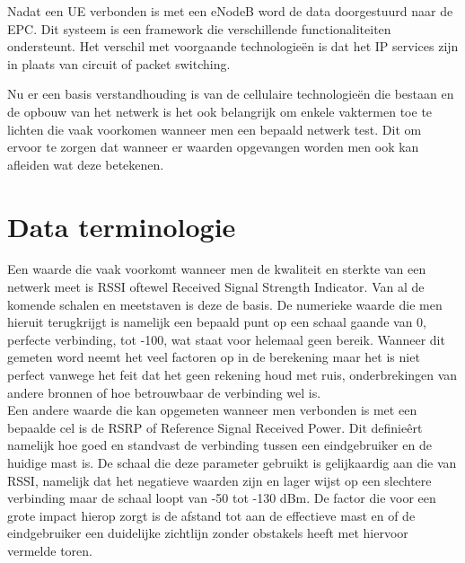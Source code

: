 Nadat een UE verbonden is met een eNodeB word de data doorgestuurd naar de EPC. Dit systeem is een framework die verschillende functionaliteiten ondersteunt. Het verschil met voorgaande technologieën is dat het IP services zijn in plaats van circuit of packet switching. \autocite{Awati2024}

\pagebreak

Nu er een basis verstandhouding is van de cellulaire technologieën die bestaan en de opbouw van het netwerk is het ook belangrijk om enkele vaktermen toe te lichten die vaak voorkomen wanneer men een bepaald netwerk test. Dit om ervoor te zorgen dat wanneer er waarden opgevangen worden men ook kan afleiden wat deze betekenen.

\section{Data terminologie}

Een waarde die vaak voorkomt wanneer men de kwaliteit en sterkte van een netwerk meet is RSSI oftewel Received Signal Strength Indicator. Van al de komende schalen en meetstaven is deze de basis. De numerieke waarde die men hieruit terugkrijgt is namelijk een bepaald punt op een schaal gaande van 0, perfecte verbinding, tot -100, wat staat voor helemaal geen bereik. Wanneer dit gemeten word neemt het veel factoren op in de berekening maar het is niet perfect vanwege het feit dat het geen rekening houd met ruis, onderbrekingen van andere bronnen of hoe betrouwbaar de verbinding wel is.  \autocite{Ramirez2023} \\

Een andere waarde die kan opgemeten wanneer men verbonden is met een bepaalde cel is de RSRP of Reference Signal Received Power. Dit definieêrt namelijk hoe goed en standvast de verbinding tussen een eindgebruiker en de huidige mast is. De schaal die deze parameter gebruikt is gelijkaardig aan die van RSSI, namelijk dat het negatieve waarden zijn en lager wijst op een slechtere verbinding maar de schaal loopt van -50 tot -130 dBm. De factor die voor een grote impact hierop zorgt is de afstand tot aan de effectieve mast en of de eindgebruiker een duidelijke zichtlijn zonder obstakels heeft met hiervoor vermelde toren. \autocite{Ramirez2023} \\




